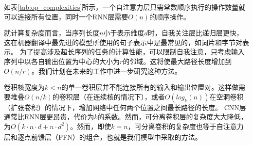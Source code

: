 如表\ref{tab:op_complexities}所示，一个自注意力层只需常数顺序执行的操作数量就可以连接所有位置，同时一个RNN层需要$O(n)$的顺序操作。


就计算复杂度而言，当序列长度$n$小于表示维度$d$时，自我关注层比递归层更快，这在机器翻译中最先进的模型所使用的句子表示中是最常见的，如词片\citep{wu2016google}和字节对\citep{sennrich2015neural}表示。
为了提高涉及超长序列的任务的计算性能，可以限制自我注意，只考虑输入序列中以各自输出位置为中心的大小为$r$的邻域。这将使最大路径长度增加到$O(n/r)$。我们计划在未来的工作中进一步研究这种方法。


卷积核宽度为$k<n$的单一卷积层并不能连接所有的输入和输出位置对。这样做需要堆叠$O(n/k)$的卷积层（在连续核的情况下），或者$O(log_k(n))$在空洞卷积（扩张卷积）\citep{NalBytenet2017}的情况下，增加网络中任何两个位置之间最长路径的长度。
CNN层通常比RNN层更昂贵，代价为$k$的系数。然而，可分离卷积层的复杂度大大降低，为$O(k\cdot n\cdot d + n\cdot d^2)$。然而，即使$k=n$，可分离卷积的复杂度也等于自注意力层和逐点前馈层（FFN）的组合，也就是我们模型中采取的方法。

